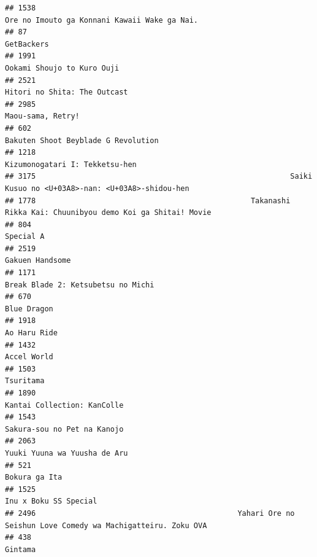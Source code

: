 \documentclass[
]{article}
\begin{document}
\begin{verbatim}
## 1538                                                              Ore no Imouto ga Konnani Kawaii Wake ga Nai.
## 87                                                                                                  GetBackers
## 1991                                                                                Ookami Shoujo to Kuro Ouji
## 2521                                                                              Hitori no Shita: The Outcast
## 2985                                                                                         Maou-sama, Retry!
## 602                                                                        Bakuten Shoot Beyblade G Revolution
## 1218                                                                            Kizumonogatari I: Tekketsu-hen
## 3175                                                          Saiki Kusuo no <U+03A8>-nan: <U+03A8>-shidou-hen
## 1778                                                 Takanashi Rikka Kai: Chuunibyou demo Koi ga Shitai! Movie
## 804                                                                                                  Special A
## 2519                                                                                           Gakuen Handsome
## 1171                                                                        Break Blade 2: Ketsubetsu no Michi
## 670                                                                                                Blue Dragon
## 1918                                                                                              Ao Haru Ride
## 1432                                                                                               Accel World
## 1503                                                                                                 Tsuritama
## 1890                                                                               Kantai Collection: KanColle
## 1543                                                                               Sakura-sou no Pet na Kanojo
## 2063                                                                              Yuuki Yuuna wa Yuusha de Aru
## 521                                                                                              Bokura ga Ita
## 1525                                                                                     Inu x Boku SS Special
## 2496                                              Yahari Ore no Seishun Love Comedy wa Machigatteiru. Zoku OVA
## 438                                                                                                    Gintama

\end{verbatim}
\end{document}
